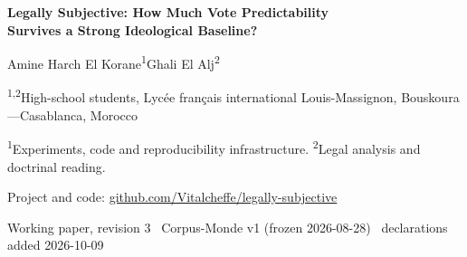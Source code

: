\documentclass[11pt,a4paper]{article}
\begin{document}
\begin{center}
{\LARGE\bfseries Legally Subjective: How Much Vote Predictability\\[3pt]
Survives a Strong Ideological Baseline?\par}
\vspace{14pt}
{\normalsize Amine Harch El Korane\textsuperscript{1}\quad Ghali El Alj\textsuperscript{2}\par}
\vspace{2pt}
{\small\textsuperscript{1,2}High-school students, Lyc\'ee fran\c{c}ais
international Louis-Massignon, Bouskoura---Casablanca, Morocco\par}
\vspace{2pt}
{\small\textsuperscript{1}Experiments, code and reproducibility
infrastructure. \textsuperscript{2}Legal analysis and doctrinal reading.\par}
\vspace{2pt}
{\small Project and code: \href{https://github.com/Vitalcheffe/legally-subjective}{github.com/Vitalcheffe/legally-subjective}\par}
\vspace{4pt}
{\small Working paper, revision 3 \textperiodcentered\ Corpus-Monde v1 (frozen 2026-08-28)
\textperiodcentered\ declarations added 2026-10-09\par}
\end{center}
\vspace{6pt}
\end{document}
